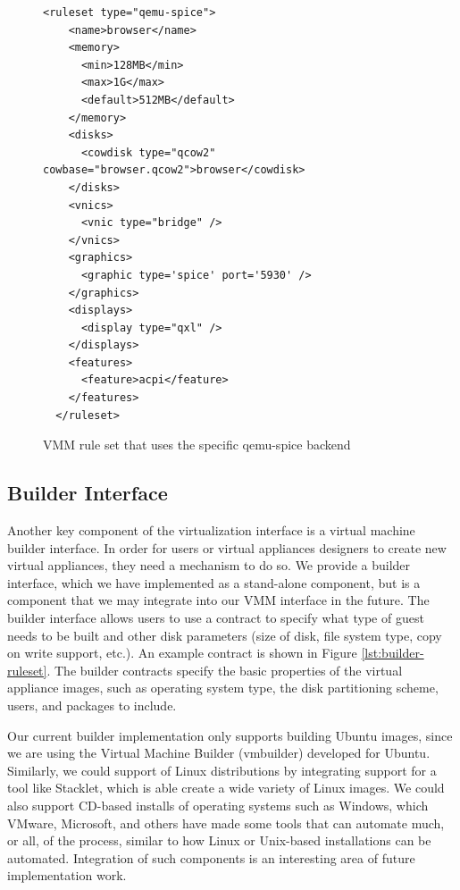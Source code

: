 \begin{figure}[tbp]
\caption{VMM rule set that uses the specific qemu-spice backend}
\label{lst:specific-vmm}
\begin{lstlisting}
<ruleset type="qemu-spice">
    <name>browser</name>
    <memory>
      <min>128MB</min>
      <max>1G</max>
      <default>512MB</default>
    </memory>
    <disks>
      <cowdisk type="qcow2" cowbase="browser.qcow2">browser</cowdisk>
    </disks>
    <vnics>
      <vnic type="bridge" />
    </vnics>
    <graphics>
      <graphic type='spice' port='5930' />
    </graphics>
    <displays>  
      <display type="qxl" />
    </displays>
    <features>
      <feature>acpi</feature>
    </features>
  </ruleset>
\end{lstlisting}
\end{figure}

\subsection{Builder Interface}
\label{sec:builder-implementation}

Another key component of the virtualization interface is a virtual machine builder interface. In order for users or virtual appliances designers to create new virtual appliances, they need a mechanism to do so. We provide a builder interface, which we have implemented as a stand-alone component, but is a component that we may integrate into our VMM interface in the future. The builder interface allows users to use a contract to specify what type of guest needs to be built and other disk parameters (size of disk, file system type, copy on write support, etc.). An example contract is shown in Figure \ref{lst:builder-ruleset}. The builder contracts specify the basic properties of the virtual appliance images, such as operating system type, the disk partitioning scheme, users, and packages to include.

Our current builder implementation only supports building Ubuntu images, since we are using the Virtual Machine Builder (vmbuilder)\cite{vmbuilder_website} developed for Ubuntu. Similarly, we could support of Linux distributions by integrating support for a tool like Stacklet\cite{stacklet_website}, which is able create a wide variety of Linux images. We could also support CD-based installs of operating systems such as Windows, which VMware, Microsoft, and others have made some tools that can automate much, or all, of the process, similar to how Linux or Unix-based installations can be automated. Integration of such components is an interesting area of future implementation work.

